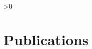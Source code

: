 \begin{refsection}
\nocite{*}

\cvTalksSections

\end{refsection}
\fi

\ifnum\cvPublicationsCount>0
\section{\textbf{Publications} \hfill \textcolor{darkblue}{\scriptsize \cvPublicationsKey}}

\begin{refsection}
\nocite{*}

\cvPublicationsSections

\end{refsection}
\fi

\vspace{5mm}
{\footnotesize
\cvFooter
}


